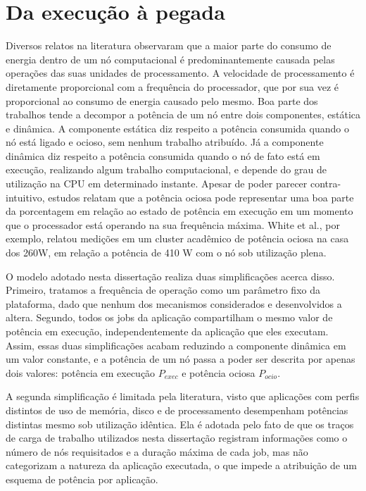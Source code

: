 \section{Da execução à pegada}
\label{sec:execucao-a-pegada}

Diversos relatos na literatura observaram que a maior parte do consumo de energia dentro de um nó computacional
é predominantemente causada pelas operações das suas unidades de processamento. A velocidade de processamento é diretamente
proporcional com a frequência do processador, que por sua vez é proporcional ao consumo de energia causado pelo mesmo. 
Boa parte dos trabalhos tende a decompor a potência de um nó entre dois componentes, estática e dinâmica. 
A componente estática diz respeito a potência consumida quando o nó está ligado e ocioso,  
sem nenhum trabalho atribuído. Já a componente dinâmica diz respeito a potência consumida 
quando o nó de fato está em execução, realizando algum trabalho computacional, e depende do grau de utilização 
na CPU em determinado instante. Apesar de poder parecer contra-intuitivo, estudos relatam que a 
potência ociosa pode representar uma boa parte da porcentagem em relação ao estado de potência em 
execução em um momento que o processador está operando na sua frequência máxima. White et al., por exemplo,
relatou medições em um cluster acadêmico de potência ociosa na casa dos 260W, em relação a potência 
de 410 W com o nó sob utilização plena.

O modelo adotado nesta dissertação realiza duas simplificações acerca disso. Primeiro, tratamos a frequência
de operação como um parâmetro fixo da plataforma, dado que nenhum dos mecanismos considerados e desenvolvidos 
a altera. Segundo, todos os jobs da aplicação compartilham o mesmo valor de potência em execução, 
independentemente da aplicação que eles executam. Assim, essas duas simplificações acabam reduzindo a
componente dinâmica em um valor constante, e a potência de um nó passa a poder ser descrita por apenas dois valores:
potência em execução $P_{exec}$ e potência ociosa $P_{ocio}$. 

A segunda simplificação é limitada pela literatura, visto que aplicações com perfis distintos de uso de memória,
disco e de processamento desempenham potências distintas mesmo sob utilização idêntica. Ela é adotada pelo fato de que
os traços de carga de trabalho utilizados nesta dissertação registram informações como o número de nós requisitados
e a duração máxima de cada job, mas não categorizam a natureza da aplicação executada, o que impede a atribuição
de um esquema de potência por aplicação.

